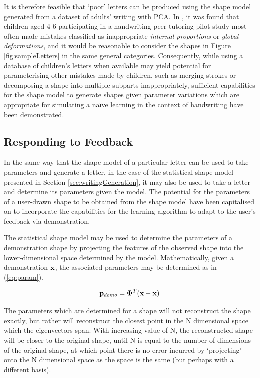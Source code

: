 \documentclass{sig-alternate}
\begin{document}
It is therefore feasible that `poor' letters can be produced using the shape
model generated from a dataset of adults' writing with PCA. In
\cite{Chandra2013}, it was found that children aged 4-6 participating in a
handwriting peer tutoring pilot study most often made mistakes classified as
inappropriate \emph{internal proportions} or \emph{global deformations}, and it
would be reasonable to consider the shapes in Figure \ref{fig:sampleLetters} in
the same general categories. Consequently, while using a database of children's
letters when available may yield potential for parameterising other mistakes
made by children, such as merging strokes or decomposing a shape into multiple
subparts inappropriately, sufficient capabilities for the shape model to
generate shapes given parameter variations which are appropriate for simulating
a na\"ive learning in the context of handwriting have been demonstrated.


\subsection{Responding to Feedback}

In the same way that the shape model of a particular letter can be used to take
parameters and generate a letter, in the case of the statistical shape model
presented in Section \ref{sec:writingGeneration}, it may also be used to take a
letter and determine its parameters given the model. The potential for the
parameters of a user-drawn shape to be obtained from the shape model have been
capitalised on to incorporate the capabilities for the learning algorithm to
adapt to the user's feedback via demonstration.

The statistical shape model may be used to determine the parameters of a
demonstration shape by projecting the features of the observed shape into the
lower-dimensional space determined by the model. Mathematically, given a
demonstration ${\bf x}$, the associated parameters may be determined as in
(\ref{eq:param}).

\begin{equation}\label{eq:param}
{\bf p}_{demo} ={\bf \Phi}^T ({\bf {x}-\bar{x}})
\end{equation}

The parameters which are determined for a shape will not reconstruct the shape
exactly, but rather will reconstruct the closest point in the N dimensional
space which the eigenvectors span. With increasing value of N, the reconstructed
shape will be closer to the original shape, until N is equal to the number of
dimensions of the original shape, at which point there is no error incurred by
`projecting' onto the N dimensional space as the space is the same (but perhaps
with a different basis).
\end{document}
